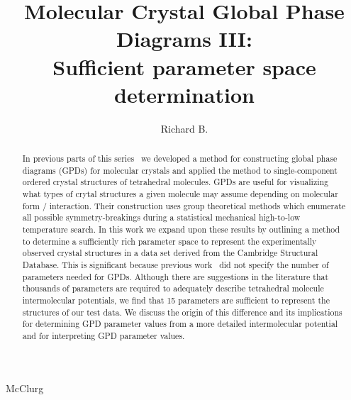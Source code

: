 \documentclass[preprint]{iucr}              %
\begin{document}
\title{Molecular Crystal Global Phase Diagrams III:\\ Sufficient parameter space
determination}

\author[a,d]{Richard B.}{McClurg}



\begin{abstract}
\scriptsize%
In previous parts of this series~\cite{Mettes04,McClurg09} we developed a method
for constructing global phase diagrams (GPDs) for molecular crystals and applied
the method to single-component ordered crystal structures of tetrahedral
molecules. GPDs are useful for visualizing what types of crytal structures a
given molecule may assume depending on molecular form / interaction.  Their
construction uses group theoretical methods which enumerate all possible
symmetry-breakings during a statistical mechanical high-to-low temperature
search. 
In this work we expand upon these results by outlining a method to determine a
sufficiently rich parameter space to represent the experimentally observed
crystal structures in a data set derived from the Cambridge Structural Database.
 This is significant because previous work~\cite{Mettes04} did not specify the
number of parameters needed for GPDs. Although there are suggestions in the
literature that thousands of parameters are required to adequately describe
tetrahedral molecule intermolecular potentials, we find that 15 parameters are
sufficient to represent the structures of our test data.  We discuss the origin
of this difference and its implications for determining GPD parameter values
from a more detailed intermolecular potential and for interpreting GPD parameter
values. 
\normalsize
\end{abstract}

\maketitle
\end{document}
